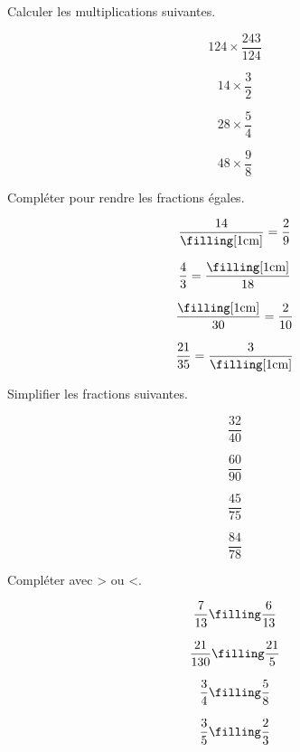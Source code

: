  Calculer les multiplications suivantes.

\begin{multicols}{4}
    $$124\times \dfrac{243}{124}$$\vspace*{1.7cm}
    
    \columnbreak
    $$14\times \dfrac{3}{2}$$\vspace*{1.7cm}
    
    \columnbreak
    $$28\times \dfrac{5}{4}$$\vspace*{1.7cm}
    
    \columnbreak
    $$48\times \dfrac{9}{8}$$\vspace*{1.7cm}
\end{multicols}

 Compléter pour rendre les fractions égales.

\begin{multicols}{4}
    $$ \dfrac{14}{\text{\filling[1cm]}}=\dfrac{2}{9}$$

    $$ \dfrac{4}{3}=\dfrac{\text{\filling[1cm]}}{18}$$

    $$ \dfrac{\text{\filling[1cm]}}{30}=\dfrac{2}{10}$$

    $$ \dfrac{21}{35}=\dfrac{3}{\text{\filling[1cm]}}$$
\end{multicols}

 Simplifier les fractions suivantes.

\begin{multicols}{4}
    $$\dfrac{32}{40}$$\vspace*{1.7cm}
    
    \columnbreak
    $$\dfrac{60}{90}$$\vspace*{1.7cm}
    
    \columnbreak
    $$\dfrac{45}{75}$$\vspace*{1.7cm}
    
    \columnbreak
    $$\dfrac{84}{78}$$\vspace*{1.7cm}
\end{multicols}

 Compléter avec > ou <.

\begin{multicols}{4}
    $$\dfrac{7}{13}\text{\filling}\dfrac{6}{13}$$\vspace*{1.7cm}
    
    \columnbreak
    $$\dfrac{21}{130}\text{\filling}\dfrac{21}{5}$$\vspace*{1.7cm}
    
    \columnbreak
    $$\dfrac{3}{4}\text{\filling}\dfrac{5}{8}$$\vspace*{1.7cm}
    
    \columnbreak
    $$\dfrac{3}{5}\text{\filling}\dfrac{2}{3}$$\vspace*{1.7cm}
\end{multicols}

